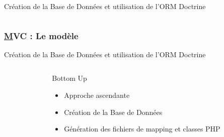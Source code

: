 \begin{frame}
\begin{block}{Création de la Base de Données et utilisation de l'ORM Doctrine}
\begin{columns}
	\end{columns}
	\end{block} 
\end{frame}

\begin{frame}
	\frametitle{\underline{M}VC : Le modèle}
	\begin{block}{Création de la Base de Données et utilisation de l'ORM Doctrine}	
		\begin{columns}
			\begin{column}{0.9cm}
			\end{column}
			\begin{column}{6cm}
				\begin{Large}Bottom Up\end{Large}
				\begin{itemize}
					\item Approche ascendante
					\item Création de la Base de Données
					\item Génération des fichiers de mapping et classes PHP
				\end{itemize}
			\end{column}
			

\end{columns}
\end{block}
\end{frame}
